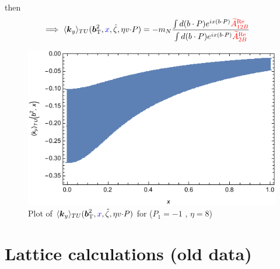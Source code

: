 \documentclass[]{article}
\numberwithin{equation}{section}
\newcommand{\tcdot}{{\cdot}}
\newcommand{\vect}[1]{\ensuremath{\boldsymbol{#1}}}
\newcommand{\vprp}[1]{\vect{#1}_{\mathrm T}}
\newcommand{\tAmp}{\widetilde{A}}
\newcommand{\tAmp}{\ensuremath{\widetilde{A}^{(+)}}}
\newcommand{\bvec}{b}
\newcommand{\zetahat}{{\hat \zeta}}
\begin{document}
then
\begin{align}
     \Longrightarrow~ \langle \vect{k}_y \rangle_{TU}(\vprp{\bvec}^2,\textcolor{blue}{x},\zetahat,\eta v \tcdot P) 
	&=-m_{N} \frac{\int d(b\cdot P)e^{ix(b\cdot P)} \textcolor{red}{\tAmp_{12B}^{\text{Re}}}}{\int d(b\cdot P)e^{ix(b\cdot P)}\textcolor{red}{\tAmp_{2B}^{\text{Re}}}}
\end{align}

\begin{figure}
    \centering
    \includegraphics[width=0.5\linewidth]{Fourierx_SiversShift_ampname_b_bnum_P1_-1_eta_8.pdf}
    \caption{Plot of $\langle \vect{k}_y \rangle_{TU}(\vprp{\bvec}^2,\textcolor{blue}{x},\zetahat,\eta v \tcdot P) $ for ($P_{1} = -1$ , $\eta=8$)}
    \label{fig:enter-label}
\end{figure}

\section{Lattice calculations (old data)}
\end{document}
